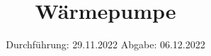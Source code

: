 
\usepackage{pgfplotstable}
\usepackage{caption}

\subject{V206}
\title{Wärmepumpe}
\date{%
  Durchführung: 29.11.2022
  \hspace{3em}
  Abgabe: 06.12.2022
}


\setlength{\parindent}{0pt} %

\maketitle
\thispagestyle{empty}
\tableofcontents
\newpage






\nocite{*}
\printbibliography{}


